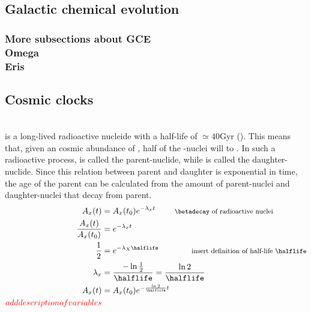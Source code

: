 \subsection{Galactic chemical evolution}
\subsubsection{More subsections about GCE \\ Omega \\ Eris}

\subsection{Cosmic clocks}
\\
 is a long-lived radioactive nucleide with a half-life of $\simeq40$Gyr (). This means that, given an cosmic abundance of , half of the -nuclei will \betadecay to . In such a radioactive process,  is called the parent-nuclide, while  is called the daughter-nuclide. Since this relation between parent and daughter is exponential in time, the age of the parent can be calculated from the amount of parent-nuclei and daughter-nuclei that decay from parent.
\begin{align*}
  A_x(t) &= A_x(t_0) e^{-\lambda_x t} 
  \qquad \text{ \footnotesize
      \betadecay of radioactive nuclei
  } \\
  \frac{A_x(t)}{A_x(t_0)} &= e^{-\lambda_x t} \\
  \frac{1}{2} &= e^{-\lambda_X \halflife}
  \qquad\qquad \text{\footnotesize 
      insert definition of half-life \halflife} \\
  \lambda_x &= \frac{-\ln\frac{1}{2}}{\halflife}
  = \frac{\ln 2}{\halflife} \\
  A_x(t) &= A_x(t_0) e^{-\frac{\ln 2}{\halflife} t} \\
  \comment{add description of variables}
\end{align*}
